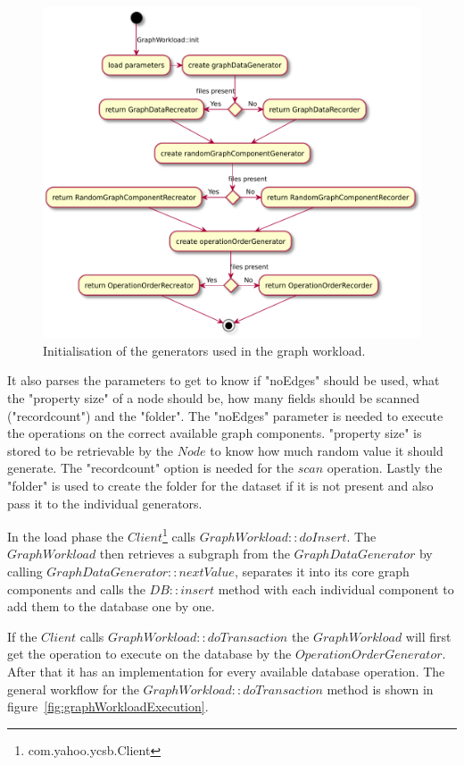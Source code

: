 \begin{figure}[h!]
  \includegraphics[width=\textwidth]{images/extensions/GraphWorkload}
  \caption{Initialisation of the generators used in the graph workload.}
  \label{fig:graphWorkloadInit}
\end{figure}

It also parses the parameters to get to know if "noEdges" should be used,
what the "property size" of a node should be,
how many fields should be scanned ("recordcount") and the "folder".
The "noEdges" parameter is needed to execute the operations on the correct available graph components.
"property size" is stored to be retrievable by the $ Node $ to know how much random value it should generate.
The "recordcount" option is needed for the $ scan $ operation.
Lastly the "folder" is used to create the folder for the dataset if it is not present and also pass it to the individual generators.

In the load phase the $ Client $\footnote{com.yahoo.ycsb.Client} calls $ GraphWorkload::doInsert $.
The $ GraphWorkload $ then retrieves a subgraph from the $ GraphDataGenerator $ by calling $ GraphDataGenerator::nextValue $,
separates it into its core graph components and calls the $ DB::insert $ method with each individual component to add them to the database one by one.

If the $ Client $ calls $ GraphWorkload::doTransaction $ the $ GraphWorkload $ will first get the operation to execute on the database by the $ OperationOrderGenerator $.
After that it has an implementation for every available database operation.
The general workflow for the $ GraphWorkload::doTransaction $ method is shown in figure~\ref{fig:graphWorkloadExecution}.

